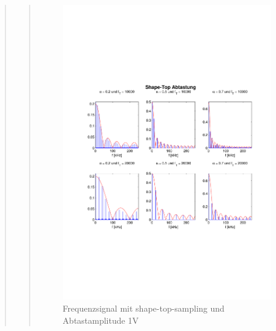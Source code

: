 \begin{quote}
\begin{quote}
  	    
  	    \begin{figure}[H]
    \centering
        \includegraphics[scale=0.6, trim = 1.5cm 6cm 1cm 8cm,
        clip]{./Bilder/shape-top-freq_1V}
            \caption{Frequenzsignal mit shape-top-sampling und Abtastamplitude
            1V}
  	    \end{figure}


\end{quote}
\end{quote}
